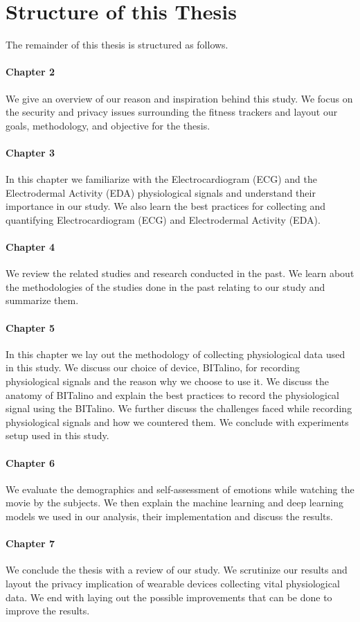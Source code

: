 \section{Structure of this Thesis}
The remainder of this thesis is structured as follows.
\paragraph{Chapter 2} We give an overview of our reason and inspiration behind this study. We focus on the security and privacy issues surrounding the fitness trackers and layout our goals, methodology, and objective for the thesis.
\paragraph{Chapter 3} In this chapter we familiarize with the Electrocardiogram (ECG) and the Electrodermal Activity (EDA) physiological signals and understand their importance in our study. We also learn the best practices for collecting and quantifying Electrocardiogram (ECG) and Electrodermal Activity (EDA).
\paragraph{Chapter 4} We review the related studies and research conducted in the past. We learn about the methodologies of the studies done in the past relating to our study and summarize them.

\paragraph{Chapter 5} In this chapter we lay out the methodology of collecting physiological data used in this study. We discuss our choice of device, BITalino, for recording physiological signals and the reason why we choose to use it. We discuss the anatomy of BITalino and explain the best practices to record the physiological signal using the BITalino. We further discuss the challenges faced while recording physiological signals and how we countered them. We conclude with experiments setup used in this study.

\paragraph{Chapter 6} We evaluate the demographics and self-assessment of emotions while watching the movie by the subjects. We then explain the machine learning and deep learning models we used in our analysis, their implementation and discuss the results.

\paragraph{Chapter 7} We conclude the thesis with a review of our study. We scrutinize our results and layout the privacy implication of wearable devices collecting vital physiological data. We end with laying out the possible improvements that can be done to improve the results. 